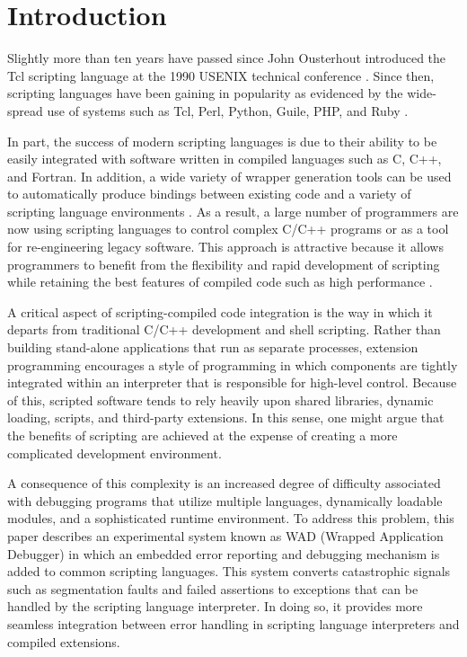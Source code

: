 \section{Introduction}

Slightly more than ten years have passed since John Ousterhout
introduced the Tcl scripting language at the 1990 USENIX technical
conference \cite{ousterhout}.  Since then, scripting languages have
been gaining in popularity as evidenced by the wide-spread use of
systems such as Tcl, Perl, Python, Guile, PHP, and Ruby
\cite{ousterhout,perl,python,guile,php,ruby}.

In part, the success of modern scripting languages is due to their
ability to be easily integrated with software written in compiled
languages such as C, C++, and Fortran.  In addition, a wide variety of wrapper
generation tools can be used
to automatically produce bindings between existing code and a
variety of scripting language environments
\cite{swig,sip,pyfort,f2py,advperl,heidrich,vtk,gwrap,wrappy}.  As a result, a large number of
programmers are now using scripting languages to control
complex C/C++ programs or as a tool for re-engineering legacy
software.  This approach is attractive because it allows programmers
to benefit from the flexibility and rapid development of
scripting while retaining the best features of compiled code such as high
performance \cite{ouster1}.

A critical aspect of scripting-compiled code integration is the way in
which it departs from traditional C/C++ development and shell
scripting.  Rather than building stand-alone applications that run as
separate processes, extension programming encourages a style of
programming in which components are tightly integrated within 
an interpreter that is responsible for high-level control.
Because of this, scripted software tends to rely heavily
upon shared libraries, dynamic loading, scripts, and
third-party extensions. In this sense, one might argue that the
benefits of scripting are achieved at the expense of creating a
more complicated development environment.

A consequence of this complexity is an increased degree of difficulty
associated with debugging programs that utilize multiple languages,
dynamically loadable modules, and a sophisticated runtime environment.
To address this problem, this paper describes an experimental system
known as WAD (Wrapped Application Debugger) in which an embedded error
reporting and debugging mechanism is added to common scripting
languages.  This system converts catastrophic signals such as
segmentation faults and failed assertions to exceptions that can be
handled by the scripting language interpreter.  In doing so, it
provides more seamless integration between error handling in
scripting language interpreters and compiled extensions. 

